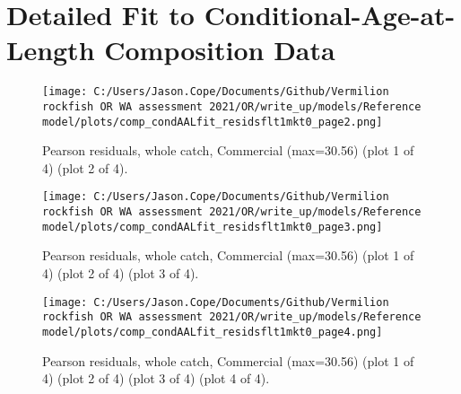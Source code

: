 \documentclass[11pt,
  english,
  a4paper,
]{article}
\begin{document}
\tagmcend\tagstructend


\hypertarget{detailed-fit-to-conditional-age-at-length-composition-data}{%
\section{Detailed Fit to Conditional-Age-at-Length Composition Data}\label{detailed-fit-to-conditional-age-at-length-composition-data}}

\leavevmode\tagmcend\tagstructend


\begin{figure}
\centering
\texttt{[image: C:/Users/Jason.Cope/Documents/Github/Vermilion rockfish OR WA assessment 2021/OR/write\_up/models/Reference model/plots/comp\_condAALfit\_residsflt1mkt0\_page2.png]}
\caption{Pearson residuals, whole catch, Commercial (max=30.56) (plot 1 of 4) (plot 2 of 4).\label{fig:comp_condAALfit_residsflt1mkt0_page2}}
\end{figure}

\tagmcend\tagstructend


\begin{figure}
\centering
\texttt{[image: C:/Users/Jason.Cope/Documents/Github/Vermilion rockfish OR WA assessment 2021/OR/write\_up/models/Reference model/plots/comp\_condAALfit\_residsflt1mkt0\_page3.png]}
\caption{Pearson residuals, whole catch, Commercial (max=30.56) (plot 1 of 4) (plot 2 of 4) (plot 3 of 4).\label{fig:comp_condAALfit_residsflt1mkt0_page3}}
\end{figure}

\tagmcend\tagstructend


\begin{figure}
\centering
\texttt{[image: C:/Users/Jason.Cope/Documents/Github/Vermilion rockfish OR WA assessment 2021/OR/write\_up/models/Reference model/plots/comp\_condAALfit\_residsflt1mkt0\_page4.png]}
\caption{Pearson residuals, whole catch, Commercial (max=30.56) (plot 1 of 4) (plot 2 of 4) (plot 3 of 4) (plot 4 of 4).\label{fig:comp_condAALfit_residsflt1mkt0_page4}}
\end{figure}
\end{document}
